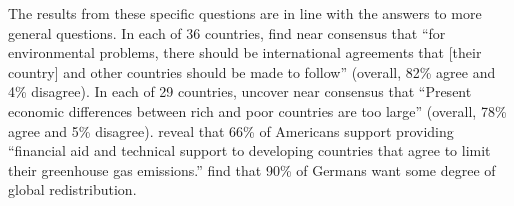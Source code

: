 The results from these specific questions are in line with the answers to more general questions. In each of 36 countries,  find near consensus that ``for environmental problems, there should be international agreements that [their country] and other countries should be made to follow'' (overall, 82\% agree and 4\% disagree). %
In each of 29 countries,  uncover near consensus that ``Present economic differences between rich and poor countries are too large'' (overall, 78\% agree and 5\% disagree).  reveal that 66\% of Americans support providing ``financial aid and technical support to developing countries that agree to limit their greenhouse gas emissions.''  find that 90\% of Germans want some degree of global redistribution. %

